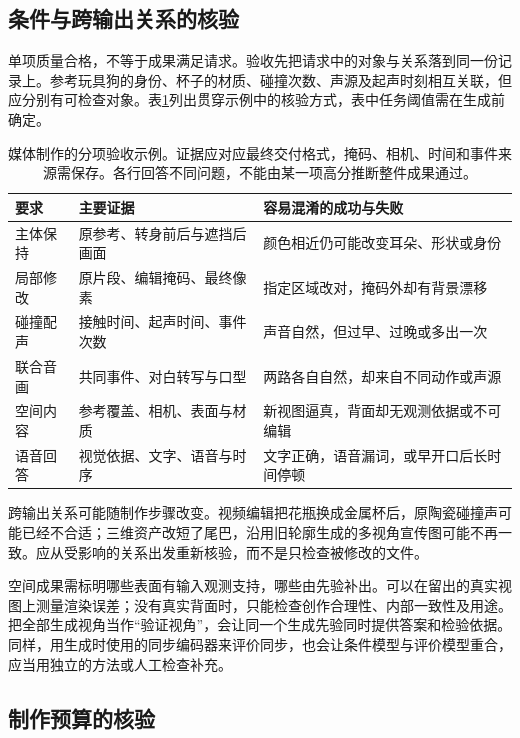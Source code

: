 \subsection{条件与跨输出关系的核验}
\label{sec:vision-multigen-relations}

单项质量合格，不等于成果满足请求。验收先把请求中的对象与关系落到同一份记录上。参考玩具狗的身份、杯子的材质、碰撞次数、声源及起声时刻相互关联，但应分别有可检查对象。表\ref{tab:vision-media-acceptance}列出贯穿示例中的核验方式，表中任务阈值需在生成前确定。

\begin{table}[tbp]
 \centering
 \small
 \begin{tabularx}{\linewidth}{@{}p{25mm}p{44mm}X@{}}
  \toprule
  要求 & 主要证据 & 容易混淆的成功与失败 \\
  \midrule
  主体保持 & 原参考、转身前后与遮挡后画面 & 颜色相近仍可能改变耳朵、形状或身份 \\
  局部修改 & 原片段、编辑掩码、最终像素 & 指定区域改对，掩码外却有背景漂移 \\
  碰撞配声 & 接触时间、起声时间、事件次数 & 声音自然，但过早、过晚或多出一次 \\
  联合音画 & 共同事件、对白转写与口型 & 两路各自自然，却来自不同动作或声源 \\
  空间内容 & 参考覆盖、相机、表面与材质 & 新视图逼真，背面却无观测依据或不可编辑 \\
  语音回答 & 视觉依据、文字、语音与时序 & 文字正确，语音漏词，或早开口后长时间停顿 \\
  \bottomrule
 \end{tabularx}
 \caption{媒体制作的分项验收示例。证据应对应最终交付格式，掩码、相机、时间和事件来源需保存。各行回答不同问题，不能由某一项高分推断整件成果通过。}
 \label{tab:vision-media-acceptance}
\end{table}
\FloatBarrier

跨输出关系可能随制作步骤改变。视频编辑把花瓶换成金属杯后，原陶瓷碰撞声可能已经不合适；三维资产改短了尾巴，沿用旧轮廓生成的多视角宣传图可能不再一致。应从受影响的关系出发重新核验，而不是只检查被修改的文件。

空间成果需标明哪些表面有输入观测支持，哪些由先验补出。可以在留出的真实视图上测量渲染误差；没有真实背面时，只能检查创作合理性、内部一致性及用途。把全部生成视角当作“验证视角”，会让同一个生成先验同时提供答案和检验依据。同样，用生成时使用的同步编码器来评价同步，也会让条件模型与评价模型重合，应当用独立的方法或人工检查补充。

\subsection{制作预算的核验}
\label{sec:vision-multigen-budget}

